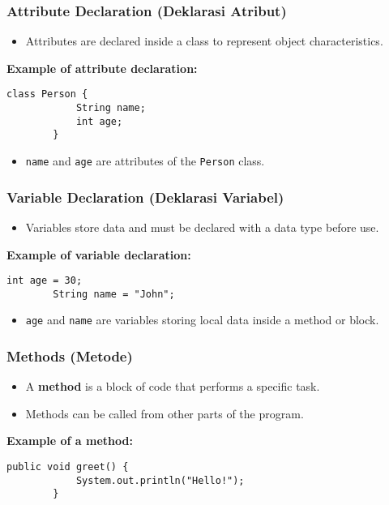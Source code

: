 \documentclass[aspectratio=169, table]{beamer}
\begin{document}
\begin{frame}[fragile]
	\frametitle{Attribute Declaration (\textbf{Deklarasi Atribut})}
	
	\begin{itemize}
		\item Attributes are declared inside a class to represent object characteristics.
	\end{itemize}
	
	\textbf{Example of attribute declaration:}
	
	\begin{lstlisting}[style=JavaStyle]
		class Person {
			String name;
			int age;
		}
	\end{lstlisting}
	
	\begin{itemize}
		\item \texttt{name} and \texttt{age} are attributes of the \texttt{Person} class.
	\end{itemize}
\end{frame}

\begin{frame}[fragile]
	\frametitle{Variable Declaration (\textbf{Deklarasi Variabel})}
	
	\begin{itemize}
		\item Variables store data and must be declared with a data type before use.
	\end{itemize}
	
	\textbf{Example of variable declaration:}
	
	\begin{lstlisting}[style=JavaStyle]
		int age = 30;
		String name = "John";
	\end{lstlisting}
	
	\begin{itemize}
		\item \texttt{age} and \texttt{name} are variables storing local data inside a method or block.
	\end{itemize}
\end{frame}

\begin{frame}[fragile]
	\frametitle{Methods (\textbf{Metode})}
	
	\begin{itemize}
		\item A \textbf{method} is a block of code that performs a specific task.
		\item Methods can be called from other parts of the program.
	\end{itemize}
	
	\textbf{Example of a method:}
	
	\begin{lstlisting}[style=JavaStyle]
		public void greet() {
			System.out.println("Hello!");
		}
	\end{lstlisting}
\end{frame}
\end{document}

